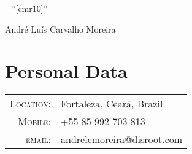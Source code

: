 \documentclass[a4paper,10pt]{article}
\begin{document}

  \pagestyle{empty} %

  \font\fb=''[cmr10]'' %

  \par{\centering
  {\Huge André Luís \Huge{Carvalho} Moreira
  }\bigskip\par}

  \section{Personal Data}

  \begin{tabular}{rl}
    \textsc{Location:}   & Fortaleza, Ceará, Brazil \\
    \textsc{Mobile:}     & +55 85 992-703-813\\
    \textsc{email:}     & {andrelcmoreira@disroot.com}
  \end{tabular} \\

\end{document}
